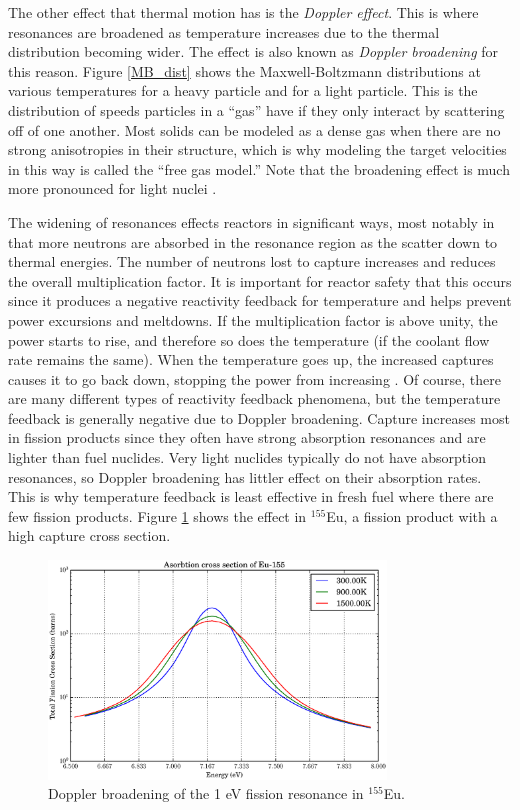 The other effect that thermal motion has is the \emph{Doppler effect}.  This is where resonances are broadened as temperature increases due to the thermal distribution becoming wider.  The effect is also known as \emph{Doppler broadening} for this reason.  Figure \ref{MB_dist} shows the Maxwell-Boltzmann distributions at various temperatures for a heavy particle and for a light particle.  This is the distribution of speeds particles in a ``gas'' have if they only interact by scattering off of one another.  Most solids can be modeled as a dense gas when there are no strong anisotropies in their structure, which is why modeling the target velocities in this way is called the ``free gas model.''  Note that the broadening effect is much more pronounced for light nuclei \cite{duderstadt}.  

The widening of resonances effects reactors in significant ways, most notably in that more neutrons are absorbed in the resonance region as the scatter down to thermal energies.  The number of neutrons lost to capture increases and reduces the overall multiplication factor.  It is important for reactor safety that this occurs since it produces a negative reactivity feedback for temperature and helps prevent power excursions and meltdowns.  If the multiplication factor is above unity, the power starts to rise, and therefore so does the temperature (if the coolant flow rate remains the same).  When the temperature goes up, the increased captures causes it to go back down, stopping the power from increasing \cite{duderstadt}.  Of course, there are many different types of reactivity feedback phenomena, but the temperature feedback is generally negative due to Doppler broadening.  Capture increases most in fission products since they often have strong absorption resonances and are lighter than fuel nuclides.  Very light nuclides typically do not have absorption resonances, so Doppler broadening has littler effect on their absorption rates.  This is why temperature feedback is least effective in fresh fuel where there are few fission products.  Figure \ref{xs_eu_broaden} shows the effect in  $^{155}$Eu, a fission product with a high capture cross section.

\begin{figure}[h!]
  \centering
    \includegraphics[width=0.8\textwidth]{graphics/xs_eu_broaden.eps}
     \caption{Doppler broadening of the 1 eV fission resonance in  $^{155}$Eu.  \label{xs_eu_broaden}}
\end{figure}

